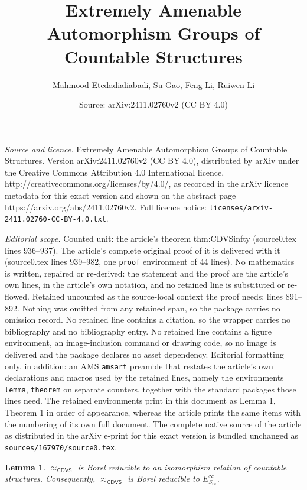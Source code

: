 \documentclass[10pt,a4paper]{amsart}
\title{Extremely Amenable Automorphism Groups of Countable Structures}
\author{Mahmood Etedadialiabadi, Su Gao, Feng Li, Ruiwen Li}
\date{Source: arXiv:2411.02760v2 (CC BY 4.0)}
\newtheorem{lemma}{Lemma}
\begin{document}
\maketitle

\noindent\emph{Source and licence.} Extremely Amenable Automorphism Groups of Countable Structures. Version arXiv:2411.02760v2 (CC BY 4.0), distributed by arXiv under the Creative Commons Attribution 4.0 International licence, http://creativecommons.org/licenses/by/4.0/, as recorded in the arXiv licence metadata for this exact version and shown on the abstract page https://arxiv.org/abs/2411.02760v2. Full licence notice: \texttt{licenses/arxiv-2411.02760-CC-BY-4.0.txt}.\par\smallskip

\noindent\textit{Editorial scope.} Counted unit: the article's theorem thm:CDVSinfty (source0.tex lines 936--937). The article's complete original proof of it is delivered with it (source0.tex lines 939--982, one \texttt{proof} environment of 44 lines). No mathematics is written, repaired or re-derived: the statement and the proof are the article's own lines, in the article's own notation, and no retained line is substituted or re-flowed.  Retained uncounted as the source-local context the proof needs: lines 891--892.  Nothing was omitted from any retained span, so the package carries no omission record.  No retained line contains a citation, so the wrapper carries no bibliography and no bibliography entry.  No retained line contains a figure environment, an image-inclusion command or drawing code, so no image is delivered and the package declares no asset dependency.  Editorial formatting only, in addition: an AMS \texttt{amsart} preamble that restates the article's own declarations and macros used by the retained lines, namely the environments \texttt{lemma}, \texttt{theorem} on separate counters, together with the standard packages those lines need.  The retained environments print in this document as Lemma 1, Theorem 1 in order of appearance, whereas the article prints the same items with the numbering of its own full document.  The complete native source of the article as distributed in the arXiv e-print for this exact version is bundled unchanged as \texttt{sources/167970/source0.tex}.
\begin{lemma}\label{lem:isomorphism} $\approx_{\mathsf{CDVS}}$ is Borel reducible to an isomorphism relation of countable structures. Consequently, $\approx_{\mathsf{CDVS}}$ is Borel reducible to $E^\infty_{S_\infty}$.
\end{lemma}
\end{document}
